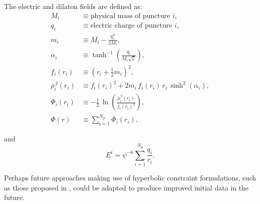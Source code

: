 The electric and dilaton fields are defined as:
\begin{align}
M_i &\equiv \text{physical mass of puncture } i, \\[4pt]
q_i &\equiv \text{electric charge of puncture } i, \\[6pt]
m_i &\equiv M_i - \frac{q_i^{\,2}}{2M_i}, \\[6pt]
\alpha_i &\equiv \tanh^{-1}\!\left(\frac{q_i}{M_i\sqrt{2}}\right), \\[6pt]
f_i(r_i) &\equiv \left(r_i + \tfrac{1}{2} m_i \right)^{2}, \\[6pt]
\bar{\rho}_i^{\,2}(r_i)
&\equiv f_i(r_i)^{2}
     + 2 m_i \, f_i(r_i)\, r_i \, \sinh^{2}(\alpha_i), \\[6pt]
\Phi_i(r_i)
&\equiv -\tfrac{1}{2}\,\ln\!\left(
\frac{\bar{\rho}_i^{\,2}(r_i)}{f_i(r_i)^{2}}
\right), \\[6pt]
\Phi(r)
&\equiv \sum_{i=1}^{N_p}\Phi_i(r_i).
\end{align}



and 
\begin{equation}
     E^i = \psi^{-6}\sum_{i=1}^{N_p} \frac{q_i}{r_i}.
\end{equation}

Perhaps future approaches making use of hyperbolic constraint formulations, such as those proposed in \cite{Tootle2025,Assumpcao2021_NRPyElliptic,Assumpcao2022_HyperbolicRelaxation,Ruter2018_HypRelax}, could be adapted to produce improved initial data in the future.\\

